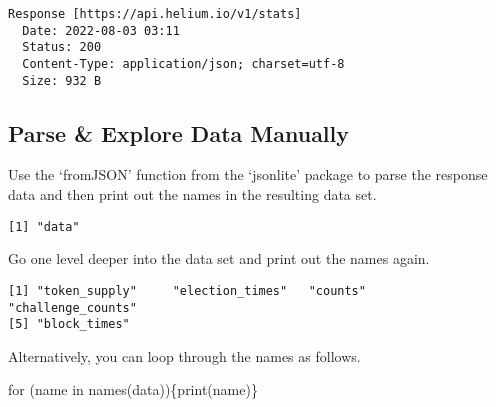 \documentclass[
  letterpaper,
  DIV=11,
  numbers=noendperiod]{scrartcl}
\newenvironment{Shaded}{\begin{snugshade}}{\end{snugshade}}
\newcommand{\ControlFlowTok}[1]{\textcolor[rgb]{0.00,0.23,0.31}{#1}}
\newcommand{\FunctionTok}[1]{\textcolor[rgb]{0.28,0.35,0.67}{#1}}
\newcommand{\NormalTok}[1]{\textcolor[rgb]{0.00,0.23,0.31}{#1}}
\newcommand{\OtherTok}[1]{\textcolor[rgb]{0.00,0.23,0.31}{#1}}
\newcommand{\SpecialCharTok}[1]{\textcolor[rgb]{0.37,0.37,0.37}{#1}}
\begin{document}
\begin{verbatim}
Response [https://api.helium.io/v1/stats]
  Date: 2022-08-03 03:11
  Status: 200
  Content-Type: application/json; charset=utf-8
  Size: 932 B
\end{verbatim}

\hypertarget{parse-explore-data-manually}{%
\subsection{Parse \& Explore Data
Manually}\label{parse-explore-data-manually}}

Use the `fromJSON' function from the `jsonlite' package to parse the
response data and then print out the names in the resulting data set.

\begin{Shaded}
\end{Shaded}

\begin{verbatim}
[1] "data"
\end{verbatim}

Go one level deeper into the data set and print out the names again.

\begin{Shaded}
\end{Shaded}

\begin{verbatim}
[1] "token_supply"     "election_times"   "counts"           "challenge_counts"
[5] "block_times"     
\end{verbatim}

Alternatively, you can loop through the names as follows.

\begin{Shaded}
\begin{Highlighting}[]
\ControlFlowTok{for}\NormalTok{ (name }\ControlFlowTok{in} \FunctionTok{names}\NormalTok{(data))\{}\FunctionTok{print}\NormalTok{(name)\}}
\end{Highlighting}
\end{Shaded}
\end{document}
